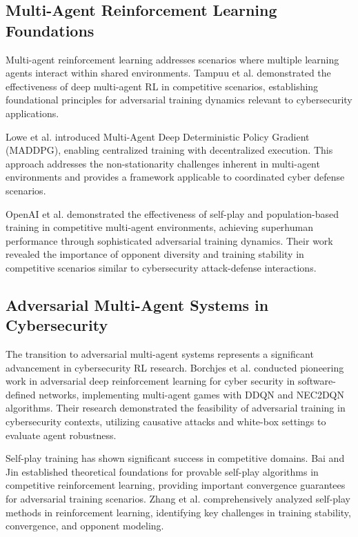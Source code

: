 \documentclass[12pt,oneside]{article}
\begin{document}
\subsection{Multi-Agent Reinforcement Learning Foundations}

Multi-agent reinforcement learning addresses scenarios where multiple learning agents interact within shared environments. Tampuu et al. \cite{tampuu2017multiagent} demonstrated the effectiveness of deep multi-agent RL in competitive scenarios, establishing foundational principles for adversarial training dynamics relevant to cybersecurity applications.

Lowe et al. \cite{lowe2017multi} introduced Multi-Agent Deep Deterministic Policy Gradient (MADDPG), enabling centralized training with decentralized execution. This approach addresses the non-stationarity challenges inherent in multi-agent environments and provides a framework applicable to coordinated cyber defense scenarios.

OpenAI et al. \cite{openai2019dota} demonstrated the effectiveness of self-play and population-based training in competitive multi-agent environments, achieving superhuman performance through sophisticated adversarial training dynamics. Their work revealed the importance of opponent diversity and training stability in competitive scenarios similar to cybersecurity attack-defense interactions.

\subsection{Adversarial Multi-Agent Systems in Cybersecurity}

The transition to adversarial multi-agent systems represents a significant advancement in cybersecurity RL research. Borchjes et al. \cite{borchjes2023adversarial} conducted pioneering work in adversarial deep reinforcement learning for cyber security in software-defined networks, implementing multi-agent games with DDQN and NEC2DQN algorithms. Their research demonstrated the feasibility of adversarial training in cybersecurity contexts, utilizing causative attacks and white-box settings to evaluate agent robustness.

Self-play training has shown significant success in competitive domains. Bai and Jin \cite{bai2020provable} established theoretical foundations for provable self-play algorithms in competitive reinforcement learning, providing important convergence guarantees for adversarial training scenarios. Zhang et al. \cite{zhang2024survey} comprehensively analyzed self-play methods in reinforcement learning, identifying key challenges in training stability, convergence, and opponent modeling.
\end{document}
